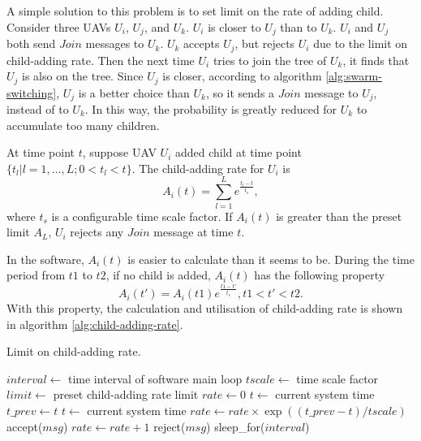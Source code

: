 A simple solution to this problem is to set limit on the rate of adding child.
Consider three UAVs $U_i$, $U_j$, and $U_k$.
$U_i$ is closer to $U_j$ than to $U_k$.
$U_i$ and $U_j$ both send $Join$ messages to $U_k$.
$U_k$ accepts $U_j$, but rejects $U_i$ due to the limit on child-adding rate.
Then the next time $U_i$ tries to join the tree of $U_k$,
it finds that $U_j$ is also on the tree.
Since $U_j$ is closer, according to algorithm \ref{alg:swarm-switching},
$U_j$ is a better choice than $U_k$,
so it sends a $Join$ message to $U_j$, instead of to $U_k$.
In this way, the probability is greatly reduced for $U_k$ to accumulate too many children.

At time point $t$,
suppose UAV $U_i$ added child at time point $\{t_l|l = 1, \ldots, L; 0 < t_l < t\}$.
The child-adding rate for $U_i$ is
\begin{equation}
    A_i(t) = \sum_{l = 1}^{L} e^{\frac{t_l - t}{t_s}},
\end{equation}
where $t_s$ is a configurable time scale factor.
If $A_i(t)$ is greater than the preset limit $A_L$,
$U_i$ rejects any $Join$ message at time $t$.

In the software, $A_i(t)$ is easier to calculate than it seems to be.
During the time period from $t1$ to $t2$, if no child is added,
$A_i(t)$ has the following property
\begin{equation}
    A_i(t') = A_i(t1) e^{\frac{t1 - t'}{t_s}}, t1 < t' < t2.
\end{equation}
With this property, the calculation and utilisation of child-adding rate
is shown in algorithm \ref{alg:child-adding-rate}.

\begin{algorithm}
\caption{Limit on child-adding rate.}
\label{alg:child-adding-rate}
\begin{algorithmic}[1]
\State $interval \gets$ time interval of software main loop
\State $tscale \gets$ time scale factor
\State $limit \gets$ preset child-adding rate limit
\State $rate \gets 0$
\State $t \gets$ current system time
 
    \State $t\_prev \gets t$
    \State $t \gets$ current system time
    \State $rate \gets rate \times \exp((t\_prev - t) / tscale)$
            \State accept($msg$)
            \State $rate \gets rate + 1$
        \Else
            \State reject($msg$)
        \EndIf
    \EndFor
    \State sleep\_for($interval$)
\EndWhile
\end{algorithmic}
\end{algorithm}

